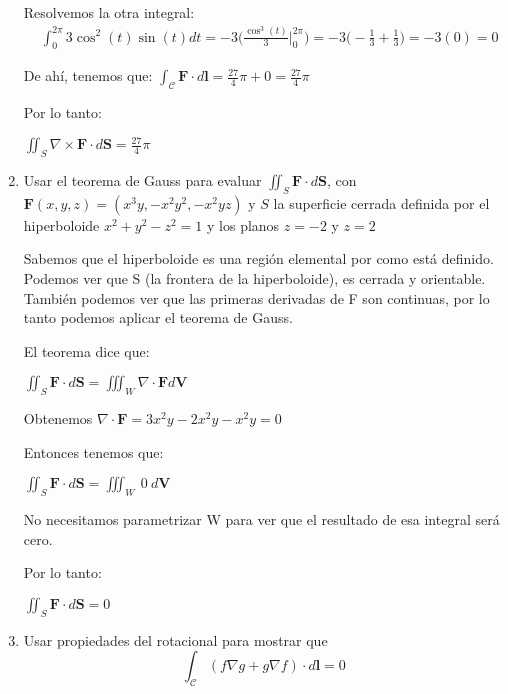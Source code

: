 \documentclass{article}
\begin{document}
\begin{enumerate}
{		Resolvemos la otra integral:
		\begin{align*}
                &\int_{0}^{2\pi}{3\cos^2(t)\sin(t)dt}
                = -3\Big( \frac{\cos^3(t)}{3}\Big |_{0}^{2\pi}\Big)
                = -3 \Big(-\frac{1}{3} + \frac{1}{3}\Big)
               	= -3 (0)
               	= 0
            \end{align*}
		
		De ahí, tenemos que:
		$\int_{\mathcal{C}} \mathbf{F} \cdot d\mathbf{l} = \frac{27}{4}\pi + 0 = \frac{27}{4}\pi$
		
		Por lo tanto:
		
		$\iint_{S} \nabla \times \mathbf{F} \cdot d\mathbf{S} = \frac{27}{4}\pi$
		
        }

        \item {
            Usar el teorema de Gauss para evaluar $\iint_{S} \mathbf{F} \cdot d\mathbf{S}$, con $\mathbf{F}(x,y,z) = (x^3y,-x^2y^2,-x^2yz)$ y $S$ la superficie cerrada definida por el hiperboloide $x^2 + y^2 - z^2 = 1$ y los planos $z = -2$ y $z = 2$

            \color{azul}
            Sabemos que el hiperboloide es una región elemental por como está definido. Podemos ver que S (la frontera de la hiperboloide), es cerrada y orientable. También podemos ver que las primeras derivadas de F son continuas, por lo tanto podemos aplicar el teorema de Gauss.
            
            El teorema dice que:
            
            $\iint_{S} \mathbf{F} \cdot d\mathbf{S} = \iiint_{W} \nabla \cdot \mathbf{F} d\mathbf{V}$
            
            Obtenemos $\nabla \cdot \mathbf{F} = 3x^2y - 2x^2y - x^2y = 0$
            
            Entonces tenemos que:
            
             $\iint_{S} \mathbf{F} \cdot d\mathbf{S} = \iiint_{W} \ 0 \  d\mathbf{V}$
             
            No necesitamos parametrizar W para ver que el resultado de esa integral será cero.
            
            Por lo tanto:
            
            $\iint_{S} \mathbf{F} \cdot d\mathbf{S} = 0$
            
            

        }

        \item {
            Usar propiedades del rotacional para mostrar que
            \[
                \int_{\mathcal{C}} {{\left(f \nabla g + g \nabla f\right)} \cdot d\mathbf{l}} = 0
            \]


}
\end{enumerate}
\end{document}
